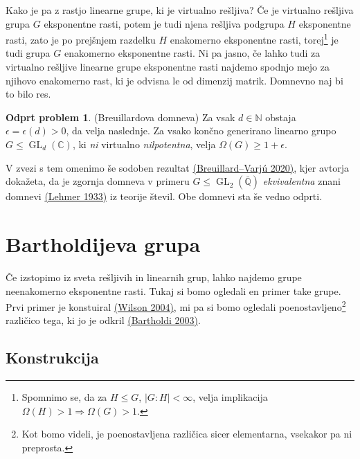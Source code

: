 \documentclass[11pt]{book}
\def\NN{\mathbb{N}}
\def\QQ{\mathbb{Q}}
\def\CC{\mathbb{C}}
\DeclareMathOperator\GL{GL}
\def\vprasanje{\color{oranzna}}
\theoremstyle{definition}
\theoremstyle{zgled}
\theoremstyle{odprtproblem}
\newtheorem*{odprtproblem}{Odprt problem}
\theoremstyle{domacanaloga}
\theoremstyle{izrek}
\begin{document}
{\vprasanje Kako je pa z rastjo linearne grupe, ki je virtualno rešljiva?}
Če je virtualno rešljiva grupa $G$ eksponentne rasti, potem je tudi njena rešljiva podgrupa $H$ eksponentne rasti, zato je po prejšnjem razdelku $H$ enakomerno eksponentne rasti, torej\footnote{Spomnimo se, da za $H \leq G$, $|G:H|< \infty$, velja implikacija $\Omega(H) > 1 \Rightarrow \Omega(G) > 1$.} je tudi grupa $G$ enakomerno eksponentne rasti.
Ni pa jasno, če lahko tudi za virtualno rešljive linearne grupe eksponentne rasti najdemo spodnjo mejo za njihovo enakomerno rast, ki je odvisna le od dimenzij matrik. Domnevno naj bi to bilo res.

\begin{odprtproblem}{\sc (Breuillardova domneva)}
Za vsak $d \in \NN$ obstaja $\epsilon = \epsilon(d) > 0$, da velja naslednje. Za vsako končno generirano linearno grupo $G \leq \GL_d(\CC)$, ki {\em ni} virtualno {\em nilpotentna}, velja $\Omega(G) \geq 1 + \epsilon$.
\end{odprtproblem}

V zvezi s tem omenimo še sodoben rezultat \href{https://www.repository.cam.ac.uk/handle/1810/287816}{(Breuillard--Varjú 2020)}, kjer avtorja dokažeta, da je zgornja domneva v primeru $G \leq \GL_2(\bar{\QQ})$ {\em ekvivalentna} znani domnevi \href{https://en.wikipedia.org/wiki/Lehmer%27s_conjecture}{(Lehmer 1933)} iz teorije števil. Obe domnevi sta še vedno odprti. 


\section{Bartholdijeva grupa}

Če izstopimo iz sveta rešljivih in linearnih grup, lahko najdemo grupe neenakomerno eksponentne rasti. Tukaj si bomo ogledali en primer take grupe. Prvi primer je konstuiral \href{https://link.springer.com/article/10.1007/s00222-003-0321-8}{(Wilson 2004)}, mi pa si bomo ogledali poenostavljeno\footnote{Kot bomo videli, je poenostavljena različica sicer elementarna, vsekakor pa ni preprosta.} različico tega, ki jo je odkril \href{https://www.sciencedirect.com/science/article/pii/S1631073X03001316}{(Bartholdi 2003)}.

\subsection{Konstrukcija}
\end{document}
